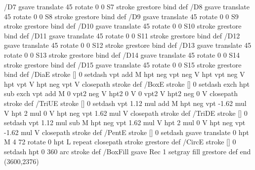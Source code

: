 {/D7 { gsave translate 45 rotate 0 0 S7 stroke grestore } bind def
/D8 { gsave translate 45 rotate 0 0 S8 stroke grestore } bind def
/D9 { gsave translate 45 rotate 0 0 S9 stroke grestore } bind def
/D10 { gsave translate 45 rotate 0 0 S10 stroke grestore } bind def
/D11 { gsave translate 45 rotate 0 0 S11 stroke grestore } bind def
/D12 { gsave translate 45 rotate 0 0 S12 stroke grestore } bind def
/D13 { gsave translate 45 rotate 0 0 S13 stroke grestore } bind def
/D14 { gsave translate 45 rotate 0 0 S14 stroke grestore } bind def
/D15 { gsave translate 45 rotate 0 0 S15 stroke grestore } bind def
/DiaE { stroke [] 0 setdash vpt add M
  hpt neg vpt neg V hpt vpt neg V
  hpt vpt V hpt neg vpt V closepath stroke } def
/BoxE { stroke [] 0 setdash exch hpt sub exch vpt add M
  0 vpt2 neg V hpt2 0 V 0 vpt2 V
  hpt2 neg 0 V closepath stroke } def
/TriUE { stroke [] 0 setdash vpt 1.12 mul add M
  hpt neg vpt -1.62 mul V
  hpt 2 mul 0 V
  hpt neg vpt 1.62 mul V closepath stroke } def
/TriDE { stroke [] 0 setdash vpt 1.12 mul sub M
  hpt neg vpt 1.62 mul V
  hpt 2 mul 0 V
  hpt neg vpt -1.62 mul V closepath stroke } def
/PentE { stroke [] 0 setdash gsave
  translate 0 hpt M 4 {72 rotate 0 hpt L} repeat
  closepath stroke grestore } def
/CircE { stroke [] 0 setdash 
  hpt 0 360 arc stroke } def
/BoxFill { gsave Rec 1 setgray fill grestore } def
end
}
\GNUPLOTpicture(3600,2376)

